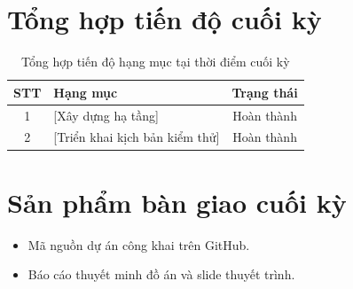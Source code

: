 \section{Tổng hợp tiến độ cuối kỳ}

\begin{table}[htbp]
    \centering
    \caption{Tổng hợp tiến độ hạng mục tại thời điểm cuối kỳ}
    \label{tab:chapter2-final-progress}
    \begin{tabularx}{\textwidth}{@{} c X c @{} }
        \toprule
        \textbf{STT} & \textbf{Hạng mục} & \textbf{Trạng thái} \\
        \midrule
        1 & [Xây dựng hạ tầng] & Hoàn thành \\
        2 & [Triển khai kịch bản kiểm thử] & Hoàn thành \\
        \bottomrule
    \end{tabularx}
\end{table}

\section{Sản phẩm bàn giao cuối kỳ}

\begin{itemize}
    \item Mã nguồn dự án công khai trên GitHub.
    \item Báo cáo thuyết minh đồ án và slide thuyết trình.
\end{itemize}
